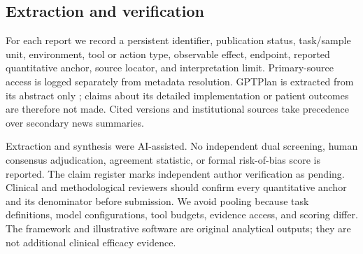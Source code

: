 \subsection{Extraction and verification}
For each report we record a persistent identifier, publication status, task/sample unit, environment, tool or action type, observable effect, endpoint, reported quantitative anchor, source locator, and interpretation limit. Primary-source access is logged separately from metadata resolution. GPTPlan is extracted from its abstract only \cite{gptplan2025}; claims about its detailed implementation or patient outcomes are therefore not made. Cited versions and institutional sources take precedence over secondary news summaries.

Extraction and synthesis were AI-assisted. No independent dual screening, human consensus adjudication, agreement statistic, or formal risk-of-bias score is reported. The claim register marks independent author verification as pending. Clinical and methodological reviewers should confirm every quantitative anchor and its denominator before submission. We avoid pooling because task definitions, model configurations, tool budgets, evidence access, and scoring differ. The framework and illustrative software are original analytical outputs; they are not additional clinical efficacy evidence.
